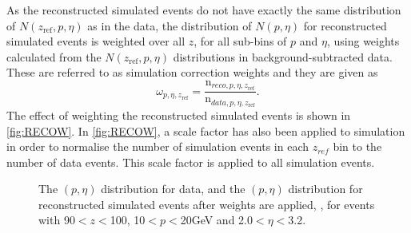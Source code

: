 As the reconstructed simulated events do not have exactly the same distribution of $N(z_{\textrm{ref}},p,\eta)$ as in the data, the distribution of $N(p, \eta)$ for reconstructed simulated events is weighted over all $z$, for all sub-bins of $p$ and $\eta$, using weights calculated from the $N(z_{\textrm{ref}},p,\eta)$ distributions in background-subtracted data. These are referred to as simulation correction weights and they are given as 
\begin{equation}
\label{eq:recow}
\omega_{p,\eta, z_{\textrm{ref}}} = \frac{\textrm{n}_{reco, p, \eta, z_{\textrm{ref}}}}{\textrm{n}_{data, p, \eta, z_{\textrm{ref}}}}.
\end{equation}
The effect of weighting the reconstructed simulated events is shown in \autoref{fig:RECOW}. In \autoref{fig:RECOW}, a scale factor has also been applied to simulation in order to normalise the number of simulation events in each $z_{ref}$ bin to the number of data events. This scale factor is applied to all simulation events. 
\begin{figure}[h!]
  \centering
  \hspace*{-1cm}
\caption{The $(p, \eta)$  distribution for data, \protect{} and the $(p, \eta)$  distribution for reconstructed simulated events after weights are applied, \protect{}, for events with 90$<z<$100\mm,  10$<p<$20\:GeV and 2.0$<\eta<$3.2.}
  \label{fig:RECOW}
\end{figure}






